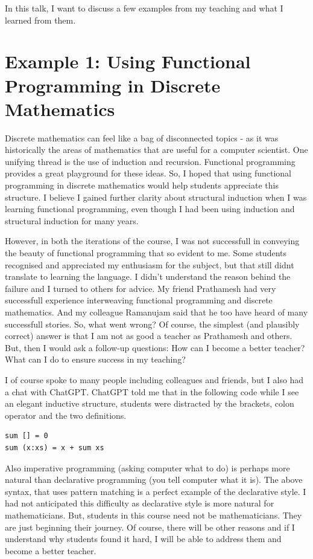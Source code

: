 \documentclass[12pt]{amsart}
\begin{document}
In this talk, I want to discuss a few examples from my teaching and what I learned from them.  

\section{Example 1: Using Functional Programming in Discrete Mathematics}

Discrete mathematics can feel like a bag of disconnected topics - as it was historically the areas of mathematics that are useful for a computer scientist.  One unifying thread is the use of induction and recursion. Functional programming provides a great playground for these ideas.  So, I hoped that using functional programming in discrete mathematics would help students appreciate this structure. I believe I gained further clarity about structural induction when I was learning functional programming, even though I had been using induction and structural induction for many years.

However, in both the iterations of the course, I was not successfull in conveying the beauty of functional programming that so evident to me.  Some students recognised and appreciated my enthusiasm for the subject, but that still didnt translate to learning the language.  I didn't understand the reason behind the failure and I turned to others for advice.  My friend Prathamesh had very successfull experience interweaving functional programming and discrete mathematics.  And my colleague Ramanujam said that he too have heard of many successfull stories.  So, what went wrong? Of course, the simplest (and plausibly correct) answer is that I am not as good a teacher as Prathamesh and others.  But, then I would ask a follow-up questions: How can I become a better teacher?  What can I do to ensure success in my teaching?  

I of course spoke to many people including colleagues and friends, but I also had a chat with ChatGPT.  ChatGPT told me that in the following code while I see an elegant inductive structure, students were distracted by the brackets, colon operator and the two definitions.    
\begin{verbatim}
sum [] = 0
sum (x:xs) = x + sum xs
\end{verbatim}
Also imperative programming (asking computer what to do) is perhaps more natural than declarative programming (you tell computer what it is). The above syntax, that uses pattern matching is a perfect example of the declarative style.  I had not anticipated this difficulty as declarative style is more natural for mathematicians.  But, students in this course need not be mathematicians.  They are just beginning their journey.  Of course, there will be other reasons and if I understand why students found it hard, I will be able to address them and become a better teacher.  
\end{document}
